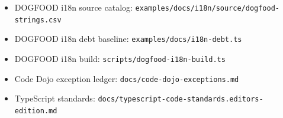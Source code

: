\begin{itemize}
\tightlist
\item
  DOGFOOD i18n source catalog: \texttt{e\allowbreak{}x\allowbreak{}a\allowbreak{}m\allowbreak{}p\allowbreak{}l\allowbreak{}e\allowbreak{}s\allowbreak{}/\allowbreak{}d\allowbreak{}o\allowbreak{}c\allowbreak{}s\allowbreak{}/\allowbreak{}i\allowbreak{}1\allowbreak{}8\allowbreak{}n\allowbreak{}/\allowbreak{}s\allowbreak{}o\allowbreak{}u\allowbreak{}r\allowbreak{}c\allowbreak{}e\allowbreak{}/\allowbreak{}d\allowbreak{}o\allowbreak{}g\allowbreak{}f\allowbreak{}o\allowbreak{}o\allowbreak{}d\allowbreak{}-\allowbreak{}s\allowbreak{}t\allowbreak{}r\allowbreak{}i\allowbreak{}n\allowbreak{}g\allowbreak{}s\allowbreak{}.\allowbreak{}c\allowbreak{}s\allowbreak{}v}
\item
  DOGFOOD i18n debt baseline: \texttt{e\allowbreak{}x\allowbreak{}a\allowbreak{}m\allowbreak{}p\allowbreak{}l\allowbreak{}e\allowbreak{}s\allowbreak{}/\allowbreak{}d\allowbreak{}o\allowbreak{}c\allowbreak{}s\allowbreak{}/\allowbreak{}i\allowbreak{}1\allowbreak{}8\allowbreak{}n\allowbreak{}-\allowbreak{}d\allowbreak{}e\allowbreak{}b\allowbreak{}t\allowbreak{}.\allowbreak{}t\allowbreak{}s}
\item
  DOGFOOD i18n build: \texttt{s\allowbreak{}c\allowbreak{}r\allowbreak{}i\allowbreak{}p\allowbreak{}t\allowbreak{}s\allowbreak{}/\allowbreak{}d\allowbreak{}o\allowbreak{}g\allowbreak{}f\allowbreak{}o\allowbreak{}o\allowbreak{}d\allowbreak{}-\allowbreak{}i\allowbreak{}1\allowbreak{}8\allowbreak{}n\allowbreak{}-\allowbreak{}b\allowbreak{}u\allowbreak{}i\allowbreak{}l\allowbreak{}d\allowbreak{}.\allowbreak{}t\allowbreak{}s}
\item
  Code Dojo exception ledger: \texttt{d\allowbreak{}o\allowbreak{}c\allowbreak{}s\allowbreak{}/\allowbreak{}c\allowbreak{}o\allowbreak{}d\allowbreak{}e\allowbreak{}-\allowbreak{}d\allowbreak{}o\allowbreak{}j\allowbreak{}o\allowbreak{}-\allowbreak{}e\allowbreak{}x\allowbreak{}c\allowbreak{}e\allowbreak{}p\allowbreak{}t\allowbreak{}i\allowbreak{}o\allowbreak{}n\allowbreak{}s\allowbreak{}.\allowbreak{}m\allowbreak{}d}
\item
  TypeScript standards: \texttt{d\allowbreak{}o\allowbreak{}c\allowbreak{}s\allowbreak{}/\allowbreak{}t\allowbreak{}y\allowbreak{}p\allowbreak{}e\allowbreak{}s\allowbreak{}c\allowbreak{}r\allowbreak{}i\allowbreak{}p\allowbreak{}t\allowbreak{}-\allowbreak{}c\allowbreak{}o\allowbreak{}d\allowbreak{}e\allowbreak{}-\allowbreak{}s\allowbreak{}t\allowbreak{}a\allowbreak{}n\allowbreak{}d\allowbreak{}a\allowbreak{}r\allowbreak{}d\allowbreak{}s\allowbreak{}.\allowbreak{}e\allowbreak{}d\allowbreak{}i\allowbreak{}t\allowbreak{}o\allowbreak{}r\allowbreak{}s\allowbreak{}-\allowbreak{}e\allowbreak{}d\allowbreak{}i\allowbreak{}t\allowbreak{}i\allowbreak{}o\allowbreak{}n\allowbreak{}.\allowbreak{}m\allowbreak{}d}
\end{itemize}

